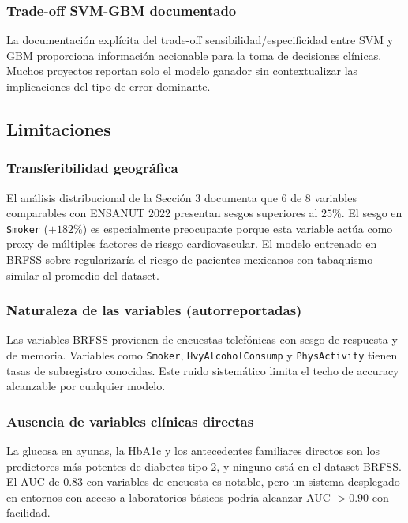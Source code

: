 \documentclass[12pt,a4paper]{article}
\begin{document}
\subsubsection{Trade-off SVM-GBM documentado}

La documentación explícita del trade-off sensibilidad/especificidad entre SVM y GBM proporciona información accionable para la toma de decisiones clínicas. Muchos proyectos reportan solo el modelo ganador sin contextualizar las implicaciones del tipo de error dominante.

\subsection{Limitaciones}

\subsubsection{Transferibilidad geográfica}

El análisis distribucional de la Sección 3 documenta que $6$ de $8$ variables comparables con ENSANUT 2022 presentan sesgos superiores al $25\%$. El sesgo en \texttt{Smoker} ($+182\%$) es especialmente preocupante porque esta variable actúa como proxy de múltiples factores de riesgo cardiovascular. El modelo entrenado en BRFSS sobre-regularizaría el riesgo de pacientes mexicanos con tabaquismo similar al promedio del dataset.

\subsubsection{Naturaleza de las variables (autorreportadas)}

Las variables BRFSS provienen de encuestas telefónicas con sesgo de respuesta y de memoria. Variables como \texttt{Smoker}, \texttt{HvyAlcoholConsump} y \texttt{PhysActivity} tienen tasas de subregistro conocidas. Este ruido sistemático limita el techo de accuracy alcanzable por cualquier modelo.

\subsubsection{Ausencia de variables clínicas directas}

La glucosa en ayunas, la HbA1c y los antecedentes familiares directos son los predictores más potentes de diabetes tipo 2, y ninguno está en el dataset BRFSS. El AUC de $0.83$ con variables de encuesta es notable, pero un sistema desplegado en entornos con acceso a laboratorios básicos podría alcanzar AUC $>0.90$ con facilidad.
\end{document}
